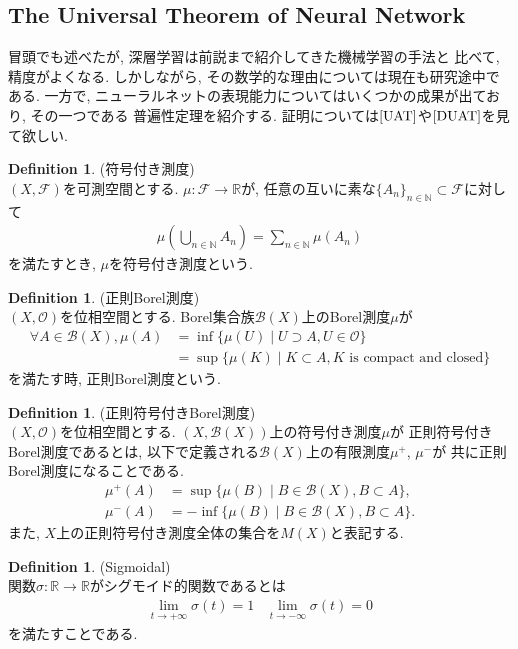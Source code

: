 \documentclass[11pt, a4paper, dvipdfmx]{jsarticle}
\theoremstyle{definition}
\newtheorem{Definition+}[Axiom+]{Definition}
\newcommand{\N}{\mathbb{N}}
\newcommand{\R}{\mathbb{R}}
\newcommand{\F}{\mathcal{F}}
\begin{document}
\subsection{The Universal Theorem of Neural Network}
冒頭でも述べたが, 深層学習は前説まで紹介してきた機械学習の手法と
比べて, 精度がよくなる. しかしながら, その数学的な理由については現在も研究途中である. 
一方で, ニューラルネットの表現能力についてはいくつかの成果が出ており, その一つである
普遍性定理を紹介する. 証明については$\cite{UAT}$や$\cite{DUAT}$を見て欲しい.
\begin{Definition+}(符号付き測度)\\
    $(X, \F)$を可測空間とする. $\mu:\F\to\R$が, 任意の互いに素な$\{A_{n}\}_{n\in\N}\subset\F$に対して
    \begin{align*}
        \mu\left(\bigcup_{n\in\N}A_{n}\right) = \sum_{n\in\N}\mu(A_{n})
    \end{align*}
    を満たすとき, $\mu$を符号付き測度という. 
\end{Definition+}
\begin{Definition+}(正則Borel測度)\\
    $(X, \mathcal{O})$を位相空間とする. Borel集合族$\mathcal{B}(X)$上のBorel測度$\mu$が
    \begin{align*}
        \forall A\in\mathcal{B}(X), \mu(A) &= \inf\{\mu(U)\mid U\supset A, U\in\mathcal{O}\} \\
                                           &= \sup\{\mu(K)\mid K\subset A, K\text{ is compact and closed}\}
    \end{align*}
    を満たす時, 正則Borel測度という. 
\end{Definition+}
\begin{Definition+}(正則符号付きBorel測度)\\
    $(X, \mathcal{O})$を位相空間とする. $(X, \mathcal{B}(X))$上の符号付き測度$\mu$が
    正則符号付きBorel測度であるとは, 以下で定義される$\mathcal{B}(X)$上の有限測度$\mu^{+}$, $\mu^{-}$が
    共に正則Borel測度になることである.
    \begin{align*}
        \mu^{+}(A) &= \sup\{\mu(B)\mid B\in\mathcal{B}(X), B\subset A\},\\
        \mu^{-}(A) &= -\inf\{\mu(B)\mid B\in\mathcal{B}(X), B\subset A\}.
    \end{align*}
    また, $X$上の正則符号付き測度全体の集合を$M(X)$と表記する.
\end{Definition+}
\begin{Definition+}(Sigmoidal)\\
    関数$\sigma:\R\to\R$がシグモイド的関数であるとは
    \begin{align*}
        \lim_{t\to+\infty} \sigma(t) = 1\hspace{10pt}\lim_{t\to-\infty} \sigma(t) = 0
    \end{align*}
    を満たすことである.
\end{Definition+}
\end{document}
